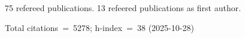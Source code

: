 75 refereed publications. 13 refeered publications as first author.

Total citations~=~5278; h-index~=~38 (2025-10-28)